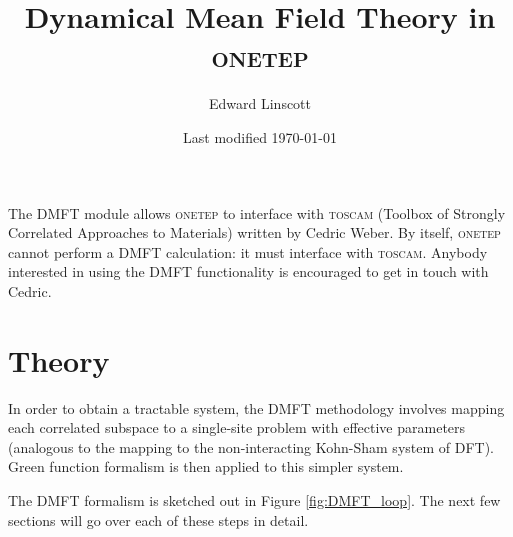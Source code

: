 \documentclass[10pt,a4paper,final]{article}
\title{Dynamical Mean Field Theory in \textsc{onetep}}
\author{Edward Linscott}
\date{Last modified \today}
\begin{document}
\maketitle

The DMFT module allows \textsc{onetep} to interface with \textsc{toscam} (Toolbox of Strongly Correlated Approaches to Materials) written by Cedric Weber. By itself, \textsc{onetep} cannot perform a DMFT calculation: it must interface with \textsc{toscam}. Anybody interested in using the DMFT functionality is encouraged to get in touch with Cedric.

\tableofcontents

\section{Theory}
In order to obtain a tractable system, the DMFT methodology involves mapping each correlated subspace to a single-site problem with effective parameters (analogous to the mapping to the non-interacting Kohn-Sham system of DFT). Green function formalism is then applied to this simpler system.

The DMFT formalism is sketched out in Figure \ref{fig:DMFT_loop}. The next few sections will go over each of these steps in detail. 
\end{document}
